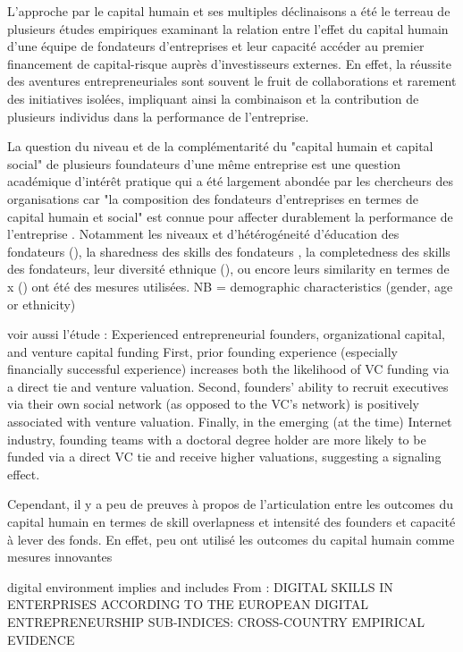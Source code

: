 \documentclass[12pt]{article}
\begin{document}
L'approche par le capital humain et ses multiples déclinaisons a été le terreau de plusieurs études empiriques examinant la relation entre l'effet du capital humain d'une équipe de fondateurs d'entreprises et leur capacité accéder au premier financement de capital-risque auprès d'investisseurs externes. En effet, la réussite des aventures entrepreneuriales sont souvent le fruit de collaborations et rarement des initiatives isolées, impliquant ainsi la combinaison et la contribution de plusieurs individus dans la performance de l'entreprise.

La question du niveau et de la complémentarité du "capital humain et capital social" de plusieurs foundateurs d'une même entreprise est une question académique d'intérêt pratique qui a été largement abondée par les chercheurs des organisations car "la composition des fondateurs d'entreprises en termes de capital humain et social" est connue pour affecter durablement la performance de l'entreprise \citet{colombo2005founders, unger2011human}. Notamment les niveaux et d'hétérogéneité d'éducation des fondateurs (\citet{pinelli2020too}), la sharedness des skills des fondateurs \citet{reese2020should}, la completedness des skills des fondateurs, leur diversité ethnique (\citet{wise2022startup}), ou encore leurs similarity en termes de x (\citet{singhal2022data}) ont été des mesures utilisées. NB = demographic characteristics (gender, age or ethnicity)

voir aussi l'étude : Experienced entrepreneurial founders, organizational capital, and venture capital funding
First, prior founding experience (especially financially successful experience) increases both the likelihood of VC funding via a direct tie and venture valuation. Second, founders’ ability to recruit executives via their own social network (as opposed to the VC’s network) is positively associated with venture valuation. Finally, in the emerging (at the time) Internet industry, founding teams with a doctoral degree holder are more likely to be funded via a direct VC tie and receive higher valuations, suggesting a signaling effect.

Cependant, il y a peu de preuves à propos de l'articulation entre les outcomes du capital humain en termes de skill overlapness et intensité des founders et capacité à lever des fonds. En effet, peu ont utilisé les outcomes du capital humain comme mesures innovantes \citep{marvel2016human}

digital environment implies and includes
From : DIGITAL SKILLS IN ENTERPRISES ACCORDING TO THE EUROPEAN DIGITAL ENTREPRENEURSHIP SUB-INDICES: CROSS-COUNTRY EMPIRICAL EVIDENCE
\end{document}
